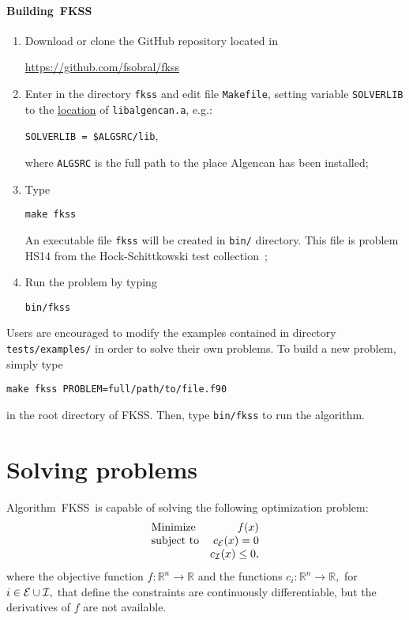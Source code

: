 \documentclass[a4paper,12pt]{article}
\newcommand{\fkss}{\textsc{FKSS}}
\newcommand{\R}{\mathbb{R}}
\begin{document}
\paragraph{Building~\fkss}
\begin{enumerate}
\item Download or clone the GitHub repository located in
  \begin{center}
    \url{https://github.com/fsobral/fkss}
  \end{center}
\item Enter in the directory \verb+fkss+ and edit file
  \verb+Makefile+, setting variable \verb+SOLVERLIB+ to the
  \underline{location} of \verb+libalgencan.a+, e.g.:
  \begin{center}
    \verb+SOLVERLIB = $ALGSRC/lib+,
  \end{center}
  where \verb+ALGSRC+ is the full path to the place Algencan has been
  installed;
\item Type
  \begin{center}
    \verb+make fkss+
  \end{center}
  An executable file \verb+fkss+ will be created in \verb+bin/+
  directory. This file is problem HS14 from the Hock-Schittkowski test
  collection~\cite{Hock1980};
\item Run the problem by typing
  \begin{center}
    \verb+bin/fkss+
  \end{center}
\end{enumerate}

Users are encouraged to modify the examples contained in directory
\verb+tests/examples/+ in order to solve their own problems. To build
a new problem, simply type
\begin{center}
  \verb+make fkss PROBLEM=full/path/to/file.f90+
\end{center}
in the root directory of \fkss. Then, type \verb+bin/fkss+ to run the
algorithm.

\section{Solving problems} \label{solving}

Algorithm~\fkss\ is capable of solving the following optimization
problem:
\begin{equation} \label{solving:prob}
  \begin{array}{lr}
    \mbox{Minimize} & f(x) \\
    \mbox{subject to} & {c_{\cal E}}(x) = 0 \\
                      & {c_{\cal I}}(x) \leq 0,
  \end{array}
\end{equation}
where the objective function $f:\R^n \rightarrow \R$ and the functions
$c_i:\R^n \rightarrow \R,$ for $i \in {\cal E} \cup {\cal I},$ that
define the constraints are continuously differentiable, but the
derivatives of $f$ are not available.
\end{document}

